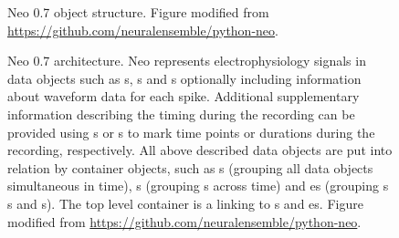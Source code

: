 \begin{figure}
    \centering
    \def\svgwidth{\textwidth}
    \resizebox{\textwidth}{!}{}
    \label{fig:neo_uml}
    \caption{Neo 0.7 object structure. Figure modified from \url{https://github.com/neuralensemble/python-neo}.}
\end{figure}


\begin{figure}
    \centering
    \def\svgwidth{\textwidth}
    
    \label{fig:neo_architecture}
    \caption{Neo 0.7 architecture. Neo represents electrophysiology signals in data objects such as s, s and s optionally including information about waveform data for each spike. Additional supplementary information describing the timing during the recording can be provided using s or s to mark time points or durations during the recording, respectively. All above described data objects are put into relation by container objects, such as s (grouping all data objects simultaneous in time), s (grouping s across time) and es (grouping s s and s). The top level container is a  linking to s and es. Figure modified from \url{https://github.com/neuralensemble/python-neo}.}
\end{figure}


% 
% 
% 
